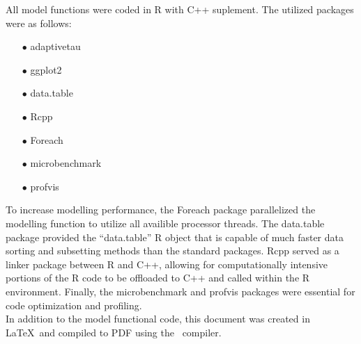 \documentclass[../Paper.tex]{subfiles}
\begin{document}
All model functions were coded in R\cite{R} with {C++} suplement.
The utilized packages were as follows:
\begin{enumerate}
  \item[$\bullet$]{adaptivetau\cite{johnson_2016}}
  \item[$\bullet$]{ggplot2\cite{Wickham_2009}}
  \item[$\bullet$]{data.table\cite{data.table}}
  \item[$\bullet$]{Rcpp\cite{Rcpp}}
  \item[$\bullet$]{Foreach\cite{foreach}}
  \item[$\bullet$]{microbenchmark\cite{microbenchmark}}
  \item[$\bullet$]{profvis\cite{profvis}}
\end{enumerate}
To increase modelling performance, the Foreach package parallelized the modelling
function to utilize all availible processor threads. The data.table package provided
the ``data.table'' R object that is capable of much faster data sorting and
subsetting methods than the standard packages. Rcpp served as a linker package
between R and {C++}, allowing for computationally intensive portions of the R code
to be offloaded to {C++} and called within the R environment.
Finally, the microbenchmark and profvis packages were essential for code
optimization and profiling.
\\
In addition to the model functional code, this document was created in \LaTeX\
and compiled to PDF using the \XeLaTeX\  compiler.
\clearpage
\end{document}
